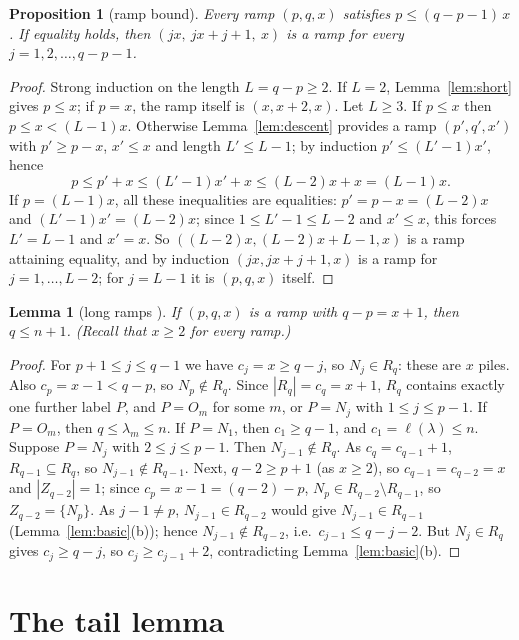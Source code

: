 \documentclass[11pt]{article}
\newtheorem{lemma}[theorem]{Lemma}
\newtheorem{proposition}[theorem]{Proposition}
\theoremstyle{definition}
\newcommand{\R}{R}
\renewcommand{\le}{\leqslant}
\renewcommand{\ge}{\geqslant}
\begin{document}
\begin{proposition}[ramp bound]\label{prop:rampbound}
Every ramp $(p,q,x)$ satisfies $p\le(q-p-1)\,x$.  If equality holds, then $(jx,\ jx+j+1,\ x)$ is a ramp
for every $j=1,2,\dots,q-p-1$.
\end{proposition}
\begin{proof}
Strong induction on the length $L=q-p\ge2$.  If $L=2$, Lemma~\ref{lem:short} gives $p\le x$; if $p=x$, the
ramp itself is $(x,x+2,x)$.  Let $L\ge3$.  If $p\le x$ then $p\le x<(L-1)x$.  Otherwise
Lemma~\ref{lem:descent} provides a ramp $(p',q',x')$ with $p'\ge p-x$, $x'\le x$ and length $L'\le L-1$; by
induction $p'\le(L'-1)x'$, hence
\[p\le p'+x\le(L'-1)x'+x\le(L-2)x+x=(L-1)x .\]
If $p=(L-1)x$, all these inequalities are equalities: $p'=p-x=(L-2)x$ and $(L'-1)x'=(L-2)x$; since
$1\le L'-1\le L-2$ and $x'\le x$, this forces $L'=L-1$ and $x'=x$.  So $((L-2)x,(L-2)x+L-1,x)$ is a ramp
attaining equality, and by induction $(jx,jx+j+1,x)$ is a ramp for $j=1,\dots,L-2$; for $j=L-1$ it is
$(p,q,x)$ itself.
\end{proof}

\begin{lemma}[long ramps {\cite[Lemma~3.4]{GH}}]\label{lem:long}
If $(p,q,x)$ is a ramp with $q-p=x+1$, then $q\le n+1$.  (Recall that $x\ge2$ for every ramp.)
\end{lemma}
\begin{proof}
For $p+1\le j\le q-1$ we have $c_j=x\ge q-j$, so $N_j\in \R_q$: these are $x$ piles.  Also
$c_p=x-1<q-p$, so $N_p\notin \R_q$.  Since $|\R_q|=c_q=x+1$, $\R_q$ contains exactly one further label $P$,
and $P=O_m$ for some $m$, or $P=N_j$ with $1\le j\le p-1$.
If $P=O_m$, then $q\le\lambda_m\le n$.  If $P=N_1$, then $c_1\ge q-1$, and $c_1=\ell(\lambda)\le n$.
Suppose $P=N_j$ with $2\le j\le p-1$.  Then $N_{j-1}\notin \R_q$.  As $c_q=c_{q-1}+1$, $\R_{q-1}\subseteq \R_q$, so
$N_{j-1}\notin \R_{q-1}$.  Next, $q-2\ge p+1$ (as $x\ge2$), so $c_{q-1}=c_{q-2}=x$ and $|Z_{q-2}|=1$; since
$c_p=x-1=(q-2)-p$, $N_p\in \R_{q-2}\setminus \R_{q-1}$, so $Z_{q-2}=\{N_p\}$.  As $j-1\ne p$, $N_{j-1}\in \R_{q-2}$ would give
$N_{j-1}\in \R_{q-1}$ (Lemma~\ref{lem:basic}(b)); hence $N_{j-1}\notin \R_{q-2}$, i.e.\ $c_{j-1}\le q-j-2$.  But
$N_j\in \R_q$ gives $c_j\ge q-j$, so $c_j\ge c_{j-1}+2$, contradicting Lemma~\ref{lem:basic}(b).
\end{proof}

\section{The tail lemma}\label{sec:tail}
\end{document}
